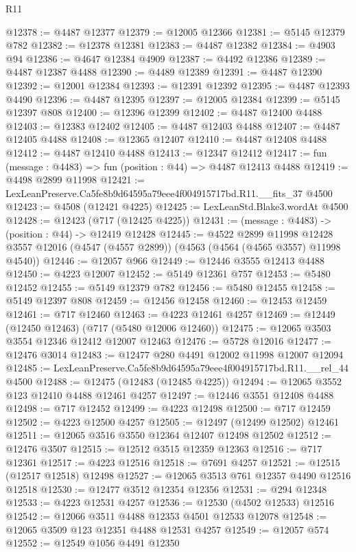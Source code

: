 \begin{lexlean}{R11}
\begin{coremodule}
@12378 := @4487 @12377
@12379 := @12005 @12366
@12381 := @5145 @12379 @782
@12382 := @12378 @12381
@12383 := @4487 @12382
@12384 := @4903 @94
@12386 := @4647 @12384 @4909
@12387 := @4492 @12386
@12389 := @4487 @12387 @4488
@12390 := @4489 @12389
@12391 := @4487 @12390
@12392 := @12001 @12384
@12393 := @12391 @12392
@12395 := @4487 @12393 @4490
@12396 := @4487 @12395
@12397 := @12005 @12384
@12399 := @5145 @12397 @808
@12400 := @12396 @12399
@12402 := @4487 @12400 @4488
@12403 := @12383 @12402
@12405 := @4487 @12403 @4488
@12407 := @4487 @12405 @4488
@12408 := @12365 @12407
@12410 := @4487 @12408 @4488
@12412 := @4487 @12410 @4488
@12413 := @12347 @12412
@12417 := fun (message : @4483) => fun (position : @44) => @4487 @12413 @4488
@12419 := @4498 @2899 @11998
@12421 := LexLeanPreserve.Ca5fe8b9d64595a79eee4f004915717bd.R11.__fits_37 @4500
@12423 := @4508 (@12421 @4225)
@12425 := LexLeanStd.Blake3.wordAt @4500
@12428 := @12423 (@717 (@12425 @4225))
@12431 := (message : @4483) -> (position : @44) -> @12419 @12428
@12445 := @4522
    @2899
    @11998
    @12428
    @3557
    @12016
    (@4547 (@4557 @2899))
    (@4563 (@4564 (@4565 @3557) @11998 @4540))
@12446 := @12057 @966
@12449 := @12446 @3555 @12413 @4488
@12450 := @4223 @12007
@12452 := @5149 @12361 @757
@12453 := @5480 @12452
@12455 := @5149 @12379 @782
@12456 := @5480 @12455
@12458 := @5149 @12397 @808
@12459 := @12456 @12458
@12460 := @12453 @12459
@12461 := @717 @12460
@12463 := @4223 @12461 @4257
@12469 := @12449 (@12450 @12463) (@717 (@5480 @12006 @12460))
@12475 := @12065 @3503 @3554 @12346 @12412 @12007 @12463
@12476 := @5728 @12016
@12477 := @12476 @3014
@12483 := @12477 @280 @4491 @12002 @11998 @12007 @12094
@12485 := LexLeanPreserve.Ca5fe8b9d64595a79eee4f004915717bd.R11.__rel_44 @4500
@12488 := @12475 (@12483 (@12485 @4225))
@12494 := @12065 @3552 @123 @12410 @4488 @12461 @4257
@12497 := @12446 @3551 @12408 @4488
@12498 := @717 @12452
@12499 := @4223 @12498
@12500 := @717 @12459
@12502 := @4223 @12500 @4257
@12505 := @12497 (@12499 @12502) @12461
@12511 := @12065 @3516 @3550 @12364 @12407 @12498 @12502
@12512 := @12476 @3507
@12515 := @12512 @3515 @12359 @12363
@12516 := @717 @12361
@12517 := @4223 @12516
@12518 := @7691 @4257
@12521 := @12515 (@12517 @12518) @12498
@12527 := @12065 @3513 @761 @12357 @4490 @12516 @12518
@12530 := @12477 @3512 @12354 @12356
@12531 := @294 @12348
@12533 := @4223 @12531 @4257
@12536 := @12530 (@4502 @12533) @12516
@12542 := @12066 @3511 @4488 @12353 @4501 @12533 @12078
@12548 := @12065 @3509 @123 @12351 @4488 @12531 @4257
@12549 := @12057 @574
@12552 := @12549 @1056 @4491 @12350

\end{coremodule}
\end{lexlean}
